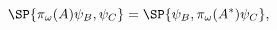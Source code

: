 \begin{equation}
    \label{eq:piomega}
    \SP{\pi_\omega(A) \psi_B, \psi_C} 
    = \SP{\psi_B, \pi_\omega(A^*)\psi_C},
\end{equation}

